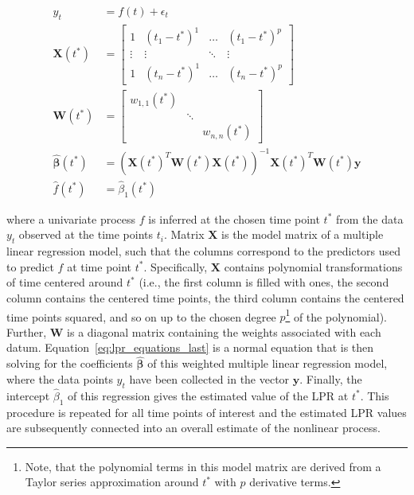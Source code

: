 \documentclass[man, floatsintext]{apa7}
\begin{document}
\begin{align}
  y_t                           & = f(t) + \epsilon_t           \\
  \textbf{X}(t^*)               & =
  \begin{bmatrix}
    1      & (t_1 - t^*)^1 & \dots  & (t_1 - t^*)^p \\
    \vdots & \vdots        & \ddots & \vdots        \\
    1      & (t_n - t^*)^1 & \dots  & (t_n - t^*)^p
  \end{bmatrix} \\
  \textbf{W}(t^*)               & =
  \begin{bmatrix}
    w_{1, 1}(t^*) &        &               \\
                  & \ddots &               \\
                  &        & w_{n, n}(t^*)
  \end{bmatrix}                           \\
  \boldsymbol{\hat{\beta}}(t^*) & =
  (\textbf{X}(t^*)^T\textbf{W}(t^*)\textbf{X}(t^*))^{-1}
  \textbf{X}(t^*)^T\textbf{W}(t^*)\textbf{y}
  \label{eq:lpr_equations_last}                                 \\
  \hat{f}(t^*)                  & = \hat{\beta}_1(t^*)
\end{align}

\noindent where a univariate process $f$ is inferred at the chosen time point
$t^*$ from the data $y_t$ observed at the time points $t_i$. Matrix
$\textbf{X}$ is the model matrix of a multiple linear regression model, such
that the columns correspond to the predictors used to predict $f$ at time point
$t^*$. Specifically, $\textbf{X}$ contains polynomial transformations of time
centered around $t^*$ (i.e., the first column is filled with ones, the second
column contains the centered time points, the third column contains the
centered time points squared, and so on up to the chosen degree
$p$\footnote{Note, that the polynomial terms in this model matrix are derived
  from a Taylor series approximation around $t^*$ with $p$ derivative terms.}
of
the polynomial). Further, \textbf{W} is a diagonal matrix containing the
weights associated with each datum. Equation~\ref{eq:lpr_equations_last} is a
normal equation that is then solving for the coefficients
$\boldsymbol{\hat{\beta}}$ of this weighted multiple linear regression model,
where the data points $y_t$ have been collected in the vector $\textbf{y}$.
Finally, the intercept $\hat{\beta}_1$ of this regression gives the estimated
value of the LPR at $t^*$. This procedure is repeated for all time points of
interest and the estimated LPR values are subsequently connected into an
overall estimate of the nonlinear process.
\end{document}

